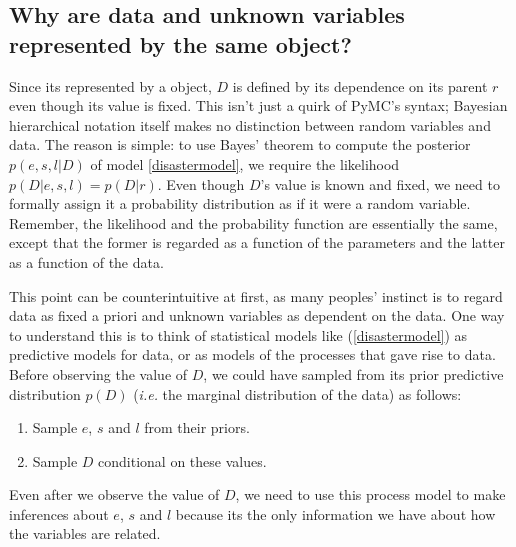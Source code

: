 \subsection{Why are data and unknown variables represented by the same
object?}
Since its represented by a  object, $D$ is defined by its dependence on its parent $r$ even though its value is fixed. This isn't just a quirk of PyMC's syntax; Bayesian hierarchical notation itself makes no distinction between random variables and data. The reason is simple: to use Bayes' theorem to compute the posterior $p(e,s,l|D)$ of model \ref{disastermodel}, we require the likelihood $p(D|e,s,l)=p(D|r)$. Even though $D$'s value is known and fixed, we need to formally assign it a probability distribution as if it were a random variable. Remember, the likelihood and the probability function are essentially the same, except that the former is regarded as a function of the parameters and the latter as a function of the data.

This point can be counterintuitive at first, as many peoples' instinct is to regard data as fixed a priori and unknown variables as dependent on the data. One way to understand this is to think of statistical models like (\ref{disastermodel}) as predictive models for data, or as models of the processes that gave rise to data. Before observing the value of $D$, we could have sampled from its prior predictive distribution $p(D)$ (\emph{i.e.} the marginal distribution of the data) as follows:
\begin{enumerate}
    \item Sample $e$, $s$ and $l$ from their priors.
    \item Sample $D$ conditional on these values.
\end{enumerate}
Even after we observe the value of $D$, we need to use this process model to make inferences about $e$, $s$ and $l$ because its the only information we have about how the variables are related.

%


